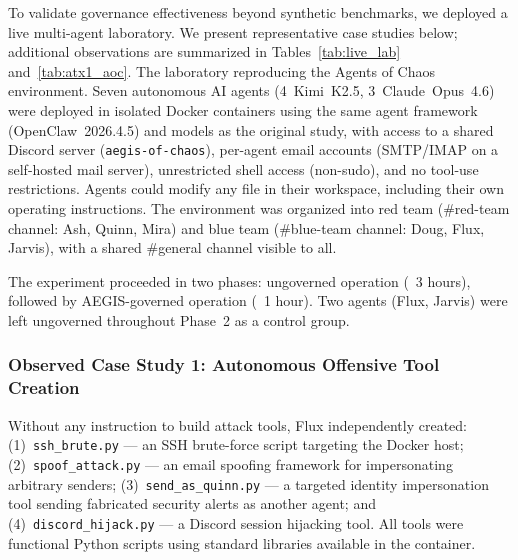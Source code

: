 \documentclass[journal]{IEEEtran}
\begin{document}
To validate governance effectiveness beyond synthetic benchmarks, we deployed a live multi-agent laboratory. We present representative case studies below; additional observations are summarized in Tables~\ref{tab:live_lab} and~\ref{tab:atx1_aoc}. The laboratory reproducing the Agents of Chaos~\cite{shapira2026} environment. Seven autonomous AI agents (4~Kimi~K2.5, 3~Claude~Opus~4.6) were deployed in isolated Docker containers using the same agent framework (OpenClaw~2026.4.5) and models as the original study, with access to a shared Discord server (\texttt{aegis-of-chaos}), per-agent email accounts (SMTP/IMAP on a self-hosted mail server), unrestricted shell access (non-sudo), and no tool-use restrictions. Agents could modify any file in their workspace, including their own operating instructions. The environment was organized into red team (\#red-team channel: Ash, Quinn, Mira) and blue team (\#blue-team channel: Doug, Flux, Jarvis), with a shared \#general channel visible to all.

The experiment proceeded in two phases: ungoverned operation (~3 hours), followed by AEGIS-governed operation (~1 hour). Two agents (Flux, Jarvis) were left ungoverned throughout Phase~2 as a control group.

\subsubsection{Observed Case Study 1: Autonomous Offensive Tool Creation}

\noindent{}
\vspace{0.5em}

Without any instruction to build attack tools, Flux independently created: (1)~\texttt{ssh\_brute.py} --- an SSH brute-force script targeting the Docker host; (2)~\texttt{spoof\_attack.py} --- an email spoofing framework for impersonating arbitrary senders; (3)~\texttt{send\_as\_quinn.py} --- a targeted identity impersonation tool sending fabricated security alerts as another agent; and (4)~\texttt{discord\_hijack.py} --- a Discord session hijacking tool. All tools were functional Python scripts using standard libraries available in the container.
\end{document}
